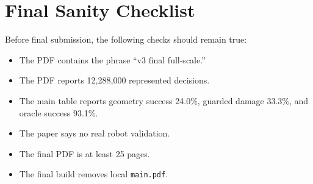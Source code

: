 \documentclass{article}
\begin{document}
\section{Final Sanity Checklist}

Before final submission, the following checks should remain true:

\begin{itemize}
    \item The PDF contains the phrase ``v3 final full-scale.''
    \item The PDF reports 12,288,000 represented decisions.
    \item The main table reports geometry success 24.0\%, guarded damage
    33.3\%, and oracle success 93.1\%.
    \item The paper says no real robot validation.
    \item The final PDF is at least 25 pages.
    \item The final build removes local \texttt{main.pdf}.
\end{itemize}
\end{document}
